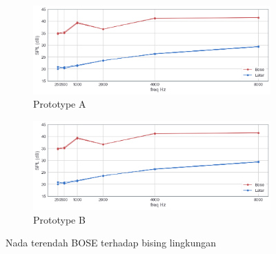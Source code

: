 \documentclass[12pt,]{article}
\begin{document}
\begin{itemize}
		\begin{figure}[!ht]
			\centering
			\begin{subfigure}[b]{0.5\textwidth}
				\includegraphics[width=\textwidth]{images/graph/boselowest_unit1}
				\caption{Prototype A}
			\end{subfigure}
			\begin{subfigure}[b]{0.5\textwidth}
				\includegraphics[width=\textwidth]{images/graph/boselowest_unit1}
				\caption{Prototype B}
			\end{subfigure}
			\caption{Nada terendah BOSE terhadap bising lingkungan}
		\end{figure}


\end{itemize}
\end{document}
